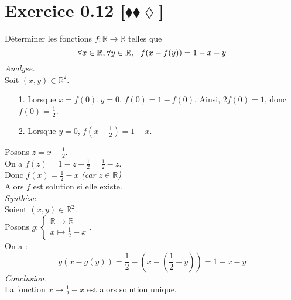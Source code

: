 \documentclass[10pt]{article}
\begin{document}
\section*{Exercice 0.12 [$\blacklozenge\blacklozenge\lozenge$]}
\begin{tcolorbox}[enhanced, width=6in, center, size=fbox, fontupper=\large, drop shadow southwest]
    Déterminer les fonctions $f: \mathbb{R} \rightarrow \mathbb{R}$ telles que 
    \begin{equation*}
        \forall{x\in\mathbb{R}},\forall{y\in\mathbb{R}}, \hspace{0.25cm} f(x-f(y)) = 1-x-y
    \end{equation*}
    \emph{Analyse.}\\
    Soit $(x,y)\in\mathbb{R}^2$.
    \begin{itemize}
        \item[1.] Lorsque $x=f(0), y=0$, $f(0)=1-f(0)$. Ainsi, $2f(0)=1$, donc $f(0)=\frac{1}{2}$.
        \item[2.] Lorsque $y=0$, $f(x-\frac{1}{2})=1-x$.
    \end{itemize}
    Posons $z=x-\frac{1}{2}$.\\
    On a $f(z)=1-z-\frac{1}{2} = \frac{1}{2}-z$.\\
    Donc $f(x)=\frac{1}{2}-x$ \emph{(car $z\in\mathbb{R}$)}\\
    Alors $f$ est solution si elle existe.\\[0.25cm]
    \emph{Synthèse.}\\
    Soient $(x,y)\in\mathbb{R}^2$.\\
    Posons $g:\begin{cases}\mathbb{R}\rightarrow\mathbb{R}\\x\mapsto{\frac{1}{2}-x}\end{cases}$.\\
    On a :
    \begin{equation*}
        g(x-g(y))=\frac{1}{2}-(x - (\frac{1}{2}-y)) = 1 - x - y
    \end{equation*}
    \emph{Conclusion.}\\
    La fonction $x\mapsto\frac{1}{2}-x$ est alors solution unique.
\end{tcolorbox}
\end{document}
